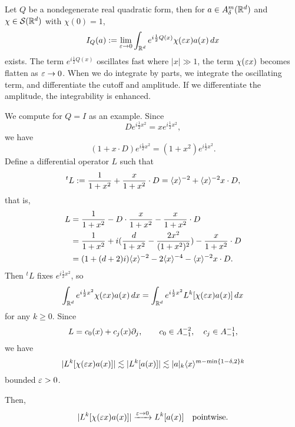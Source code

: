 \documentclass{../../small}
\begin{document}
\begin{ex*}
Let $Q$ be a nondegenerate real quadratic form, then for $a\in A_\delta^m(\mathbb{R}^d)$ and $\chi\in\mathcal{S}(\mathbb{R}^d)$ with $\chi(0)=1$,
\[I_Q(a):=\lim_{\varepsilon\to0}\int_{\mathbb{R}^d}e^{i\frac12Q(x)}\chi(\varepsilon x)a(x)\,dx\]
exists.
The term $e^{i\frac12Q(x)}$ oscillates fast where $|x|\gg1$, the term $\chi(\varepsilon x)$ becomes flatten as $\varepsilon\to0$.
When we do integrate by parts, we integrate the oscillating term, and differentiate the cutoff and amplitude.
If we differentiate the amplitude, the integrability is enhanced.
\end{ex*}
\begin{pf}
We compute for $Q=I$ as an example.
Since
\[De^{i\frac12x^2}=xe^{i\frac12x^2},\]
we have
\[(1+x\cdot D)e^{i\frac12x^2}=(1+x^2)e^{i\frac12x^2}.\]
Define a differential operator $L$ such that
\[^tL:=\frac1{1+x^2}+\frac x{1+x^2}\cdot D=\langle x\rangle^{-2}+\langle x\rangle^{-2}x\cdot D,\]
that is,
\begin{align*}
L&=\frac1{1+x^2}-D\cdot\frac x{1+x^2}-\frac x{1+x^2}\cdot D\\
&=\frac1{1+x^2}+i(\frac d{1+x^2}-\frac{2x^2}{(1+x^2)^2})-\frac x{1+x^2}\cdot D\\
&=(1+(d+2)i)\langle x\rangle^{-2}-2\langle x\rangle^{-4}-\langle x\rangle^{-2}x\cdot D.
\end{align*}
Then $^tL$ fixes $e^{i\frac12x^2}$, so
\[\int_{\mathbb{R}^d}e^{i\frac12x^2}\chi(\varepsilon x)a(x)\,dx=\int_{\mathbb{R}^d}e^{i\frac12x^2}L^k[\chi(\varepsilon x)a(x)]\,dx\]
for any $k\ge0$.
Since
\[L=c_0(x)+c_j(x)\pd_j,\qquad c_0\in A_{-1}^{-2},\quad c_j\in A_{-1}^{-1},\]
we have
\[|L^k[\chi(\varepsilon x)a(x)]|\lesssim|L^k[a(x)]| \lesssim|a|_k\langle x\rangle^{m-\min\{1-\delta,2\}k}\]
bounded $\varepsilon>0$.


Then, 
\[|L^k[\chi(\varepsilon x)a(x)]|\xrightarrow{\varepsilon\to0} L^k[a(x)]\quad\text{pointwise}.\]


\end{pf}
\end{document}
